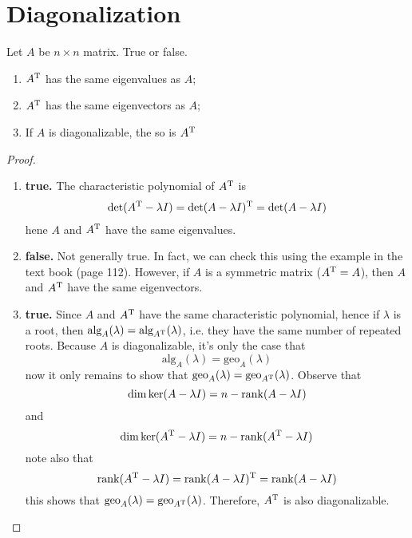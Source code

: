 \section{Diagonalization}
\begin{exercise}
  Let $A$ be $n\times n$ matrix. True or false.
  \begin{enumerate}[label={(\alph*)}]
    \item $A^\mathrm{T}$ has the same eigenvalues as $A$;
    \item $A^\mathrm{T}$ has the same eigenvectors as $A$;
    \item If $A$ is diagonalizable, the so is $A^\mathrm{T}$
  \end{enumerate}
\end{exercise}
\begin{proof}
  \begin{enumerate}[label={(\alph*)}]
    \item \textbf{true.} The characteristic polynomial of $A^\mathrm{T}$ is
      \begin{align*}
        \det(A^\mathrm{T}-\lambda I)
        =\det(A-\lambda I)^\mathrm{T}
        =\det(A-\lambda I)
      \end{align*}
      hene $A$ and $A^\mathrm{T}$ have the same eigenvalues.
    \item \textbf{false.} Not generally true. In fact, we can check this
      using the example in the text book (page 112). 
      However, if $A$ is a symmetric matrix ($A^\mathrm{T}=A$), then $A$ and 
      $A^\mathrm{T}$ have the same eigenvectors.
    \item \textbf{true.} 
      Since $A$ and $A^\mathrm{T}$ have the same characteristic polynomial, hence
      if $\lambda$ is a root, then
      $\textrm{alg}_A(\lambda)=\textrm{alg}_{A^\mathrm{T}}(\lambda)$, i.e. they have
      the same number of repeated roots. Because $A$ is diagonalizable, it's only
      the case that 
      \[\textrm{alg}_{A}(\lambda)=\textrm{geo}_{A}(\lambda)\] 
      now it only remains to show that 
      $\textrm{geo}_{A}(\lambda)=\textrm{geo}_{A^\mathrm{T}}(\lambda)$. Observe that
      \[ \dim\ker(A-\lambda I) =n-\operatorname{rank}(A-\lambda I) \]
      and
      \[ \dim\ker(A^\mathrm{T}-\lambda I) =n-\operatorname{rank}(A^\mathrm{T} -\lambda I) \] 
      note also that
      \[
        \operatorname{rank}(A^\mathrm{T}-\lambda I)=
        \operatorname{rank}(A-\lambda I)^\mathrm{T}=
        \operatorname{rank}(A-\lambda I)
      \]
      this shows that $\textrm{geo}_{A}(\lambda)=\textrm{geo}_{A^\mathrm{T}}(\lambda)$.
      Therefore, $A^\mathrm{T}$ is also diagonalizable.
  \end{enumerate}
\end{proof}
